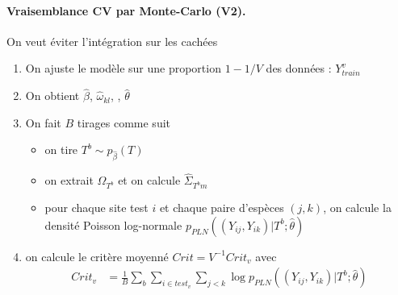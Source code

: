 \paragraph{Vraisemblance CV par Monte-Carlo (V2).}
On veut éviter l'intégration sur les cachées
\begin{enumerate}
\item On ajuste le modèle sur une proportion $1 - 1/V$ des données : $Y^v_{train}$
\item On obtient $\widehat{\beta}$, $\widehat{\omega}_{kl}$, , $\widehat{\theta}$
\item On fait $B$ tirages comme suit
\begin{itemize}
\item on tire $T^b \sim p_{\widehat{\beta}}(T)$
\item on extrait $\widehat\Omega_{T^b}$ et on calcule $\widehat\Sigma_{T^bm}$ 
\item pour chaque site test $i$ et chaque paire d'espèces $(j, k)$, on calcule la densité Poisson log-normale $p_{PLN}((Y_{ij}, Y_{ik}) | T^b; \widehat{\theta})$
\end{itemize}
\item on calcule le critère moyenné $Crit = V^{-1} Crit_v$ avec
\begin{align*}
Crit_v 
& = \frac1B \sum_b \sum_{i \in test_v} \sum_{j < k} \log p_{PLN}((Y_{ij}, Y_{ik}) | T^b; \widehat{\theta})
\end{align*}
\end{enumerate}





